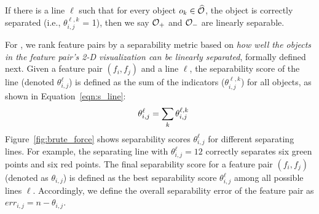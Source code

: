 \noindent If there is a line $\ell$ such that for every object $o_k\in \widehat{\oo}$, the object is correctly separated (i.e., $\theta_{i,j}^{\ell,k}$ = 1), then we say $\oo_+$ and $\oo_-$ are linearly separable.




For \genviz, we rank feature pairs by a separability metric based on {\em how well the objects in the feature pair's 2-D visualization can be linearly separated}, formally defined next.
Given a feature pair $(f_i, f_j)$ and a line $\ell$, the separability score of the line (denoted $\theta_{i, j}^\ell$) is defined as the sum of the indicators ($\theta_{i,j}^{\ell,k}$) for all objects, as shown in Equation~\ref{eqn:s_line}:
\begin{equation}\label{eqn:s_line}
\hspace{3mm} \theta_{i,j}^{\ell}= \sum_{k}{\theta_{i,j}^{\ell,k}}
\end{equation}
\noindent Figure~\ref{fig:brute_force} shows separability scores $\theta_{i, j}^\ell$ for different separating lines. For example, the separating line with $\theta_{i, j}^\ell=12$ correctly separates six green points and six red points. The final separability score for a feature pair $(f_i,f_j)$ (denoted as $\theta_{i, j}$) is defined as the best separability score $\theta_{i, j}^{\ell}$ among all possible lines $\ell$. Accordingly, we define the overall separability error of the feature pair as $err_{i,j}=n-\theta_{i, j}$.

